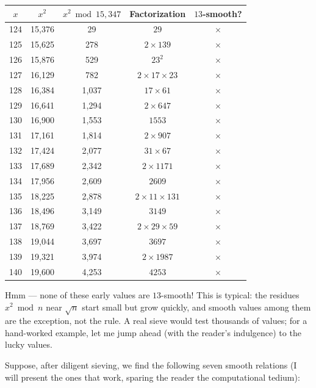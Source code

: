 \begin{center}
\begin{tabular}{c c c c c}
\toprule
$x$ & $x^2$ & $x^2 \bmod 15{,}347$ & Factorization & $13$-smooth? \\
\midrule
124 & 15,376 & 29 & $29$ & \ensuremath{\times} \\
125 & 15,625 & 278 & $2 \times 139$ & \ensuremath{\times} \\
126 & 15,876 & 529 & $23^2$ & \ensuremath{\times} \\
127 & 16,129 & 782 & $2 \times 17 \times 23$ & \ensuremath{\times} \\
128 & 16,384 & 1,037 & $17 \times 61$ & \ensuremath{\times} \\
129 & 16,641 & 1,294 & $2 \times 647$ & \ensuremath{\times} \\
130 & 16,900 & 1,553 & $1553$ & \ensuremath{\times} \\
131 & 17,161 & 1,814 & $2 \times 907$ & \ensuremath{\times} \\
132 & 17,424 & 2,077 & $31 \times 67$ & \ensuremath{\times} \\
133 & 17,689 & 2,342 & $2 \times 1171$ & \ensuremath{\times} \\
134 & 17,956 & 2,609 & $2609$ & \ensuremath{\times} \\
135 & 18,225 & 2,878 & $2 \times 11 \times 131$ & \ensuremath{\times} \\
136 & 18,496 & 3,149 & $3149$ & \ensuremath{\times} \\
137 & 18,769 & 3,422 & $2 \times 29 \times 59$ & \ensuremath{\times} \\
138 & 19,044 & 3,697 & $3697$ & \ensuremath{\times} \\
139 & 19,321 & 3,974 & $2 \times 1987$ & \ensuremath{\times} \\
140 & 19,600 & 4,253 & $4253$ & \ensuremath{\times} \\
\bottomrule
\end{tabular}
\end{center}

Hmm --- none of these early values are $13$-smooth! This is typical: the residues $x^2 \bmod n$ near $\sqrt{n}$ start small but grow quickly, and smooth values among them are the exception, not the rule. A real sieve would test thousands of values; for a hand-worked example, let me jump ahead (with the reader's indulgence) to the lucky values.

Suppose, after diligent sieving, we find the following seven smooth relations (I will present the ones that work, sparing the reader the computational tedium):


